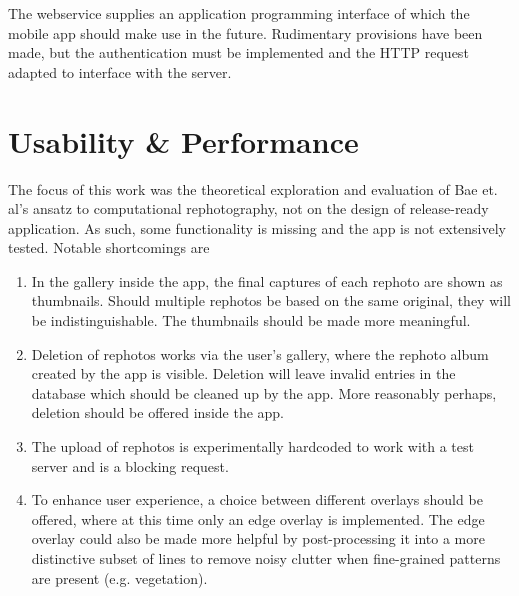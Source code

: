 The webservice supplies an application programming interface of which the mobile
app should make use in the future. Rudimentary provisions have been made, but
the authentication must be implemented and the HTTP request adapted to interface
with the server.

\section{Usability \& Performance}

The focus of this work was the theoretical exploration and evaluation of Bae et.
al's ansatz to computational rephotography, not on the design of release-ready
application. As such, some functionality is missing and the app is not
extensively tested. Notable shortcomings are
\begin{enumerate}
   \item In the gallery inside the app, the final captures of each rephoto are
      shown as thumbnails. Should multiple rephotos be based on the same
      original, they will be indistinguishable. The thumbnails should be made
      more meaningful.

   \item Deletion of rephotos works via the user's gallery, where the rephoto
      album created by the app is visible. Deletion will leave invalid entries
      in the database which should be cleaned up by the app. More reasonably
      perhaps, deletion should be offered inside the app.


   \item The upload of rephotos is experimentally hardcoded to work with a test
      server and is a blocking request.

   \item To enhance user experience, a choice between different overlays should
      be offered, where at this time only an edge overlay is implemented. The
      edge overlay could also be made more helpful by post-processing it into a
      more distinctive subset of lines to remove noisy clutter when fine-grained
      patterns are present (e.g. vegetation).


\end{enumerate}
